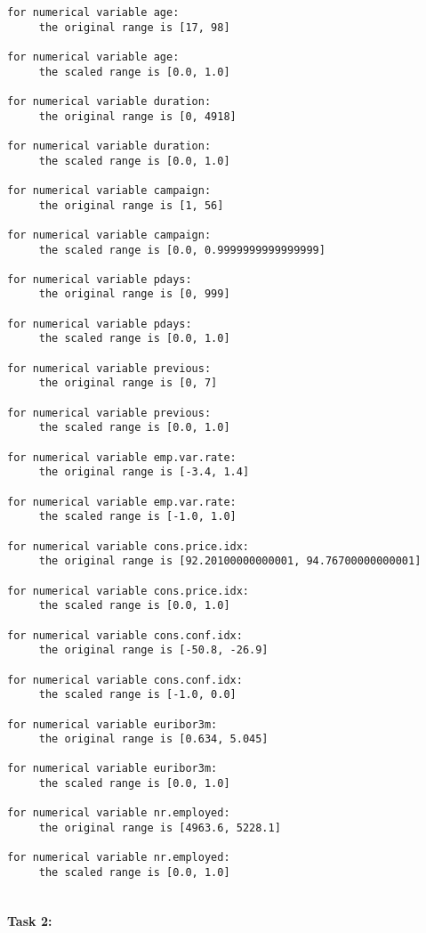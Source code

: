 \documentclass[11pt]{article}
\begin{document}
    \begin{Verbatim}[commandchars=\\\{\}]
for numerical variable age:
	 the original range is [17, 98]

for numerical variable age:
	 the scaled range is [0.0, 1.0]

for numerical variable duration:
	 the original range is [0, 4918]

for numerical variable duration:
	 the scaled range is [0.0, 1.0]

for numerical variable campaign:
	 the original range is [1, 56]

for numerical variable campaign:
	 the scaled range is [0.0, 0.9999999999999999]

for numerical variable pdays:
	 the original range is [0, 999]

for numerical variable pdays:
	 the scaled range is [0.0, 1.0]

for numerical variable previous:
	 the original range is [0, 7]

for numerical variable previous:
	 the scaled range is [0.0, 1.0]

for numerical variable emp.var.rate:
	 the original range is [-3.4, 1.4]

for numerical variable emp.var.rate:
	 the scaled range is [-1.0, 1.0]

for numerical variable cons.price.idx:
	 the original range is [92.20100000000001, 94.76700000000001]

for numerical variable cons.price.idx:
	 the scaled range is [0.0, 1.0]

for numerical variable cons.conf.idx:
	 the original range is [-50.8, -26.9]

for numerical variable cons.conf.idx:
	 the scaled range is [-1.0, 0.0]

for numerical variable euribor3m:
	 the original range is [0.634, 5.045]

for numerical variable euribor3m:
	 the scaled range is [0.0, 1.0]

for numerical variable nr.employed:
	 the original range is [4963.6, 5228.1]

for numerical variable nr.employed:
	 the scaled range is [0.0, 1.0]


    \end{Verbatim}

    \paragraph{\texorpdfstring{\textbf{Task 2}:}{Task 2:}}\label{task-2}
\end{document}
